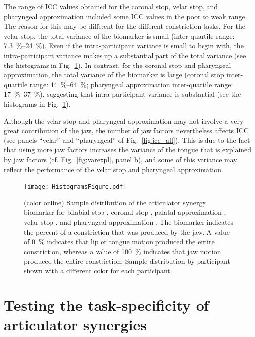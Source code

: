 \documentclass[preprint]{JASAnew}\usepackage[]{graphicx}\usepackage[]{color}
\begin{document}
The range of ICC values obtained for the coronal stop, velar stop, and pharyngeal approximation included some ICC values in the poor to weak range. 
%
The reason for this may be different for the different constriction tasks. 
%
For the velar stop, the total variance of the biomarker is small
(inter-quartile range: \SIrange{7.3}{24}{\percent}). 
Even if the intra-participant variance is small to begin with, the intra-participant variance makes up a substantial part of the total variance (see the histograms in Fig.~\ref{fig:histograms}). 
%
In contrast, for the coronal stop and pharyngeal approximation, the total variance of the biomarker is large 
(coronal stop inter-quartile range: \SIrange{44}{64}{\percent};
pharyngeal approximation inter-quartile range: \SIrange{17}{37}{\percent}),
suggesting that intra-participant variance is substantial (see the histograms in Fig.~\ref{fig:histograms}). 

Although the velar stop and pharyngeal approximation may not involve a very great contribution of the jaw, the number of jaw factors nevertheless affects ICC (see panels ``velar'' and ``pharyngeal'' of Fig.~\ref{fig:icc_all}). This is due to the fact that using more jaw factors increases the variance of the tongue that is explained by jaw factors (cf. Fig.~\ref{fig:varexpl}, panel b), and some of this variance may reflect the performance of the velar stop and pharyngeal approximation. 


\begin{figure}[t]

\texttt{[image: HistogramsFigure.pdf]}

\caption{\label{fig:histograms}(color online) 
Sample distribution of the articulator synergy biomarker for bilabial stop \textipa{[p]}, coronal stop \textipa{[t]}, palatal approximation \textipa{[i]}, velar stop \textipa{[k]}, and pharyngeal approximation \textipa{[A]}. The biomarker indicates the percent of a constriction that was produced by the jaw.
A value of \SI{0}{\percent} indicates that lip or tongue motion produced the entire constriction, whereas a value of \SI{100}{\percent} indicates that jaw motion produced the entire constriction. 
Sample distribution by participant shown with a different color for each participant.}

\end{figure}




\section{Testing the task-specificity of articulator synergies}
\label{sec:taskspec}
\end{document}
